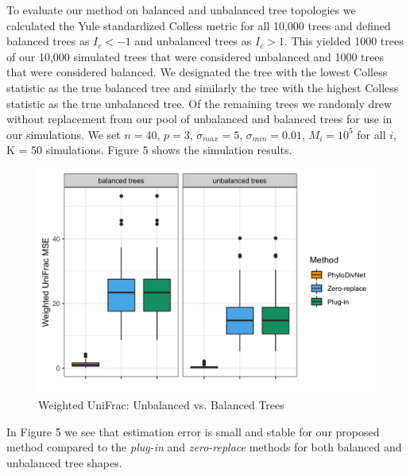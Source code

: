 \documentclass{article}
\begin{document}
To evaluate our method on balanced and unbalanced tree topologies we calculated the Yule standardized Colless metric for all 10,000 trees and defined balanced trees as $I_c < -1$ and unbalanced trees as $I_c > 1$. This yielded 1000 trees of our 10,000 simulated trees that were considered unbalanced and 1000 trees that were considered balanced. We designated the tree with the lowest Colless statistic as the true balanced tree and similarly the tree with the highest Colless statistic as the true unbalanced tree. Of the remaining trees we randomly drew without replacement from our pool of unbalanced and balanced trees for use in our simulations. We set $n = 40$, $ p = 3$, $\sigma_{max} = 5$, $\sigma_{min} = 0.01$, $M_{i} = 10^5$ for all $i$, K = 50 simulations. Figure 5 shows the simulation results.

\begin{figure}[!htb]
    \centering
    \captionsetup{singlelinecheck = false, format= hang, justification = raggedright, font = sf, labelsep = space}
    \includegraphics[width=\textwidth]{tree_vary.png}
    \caption{Weighted UniFrac: Unbalanced vs. Balanced Trees}
    \label{fig:my_label}
\end{figure}

In Figure 5 we see that estimation error is small and stable for our proposed method compared to the \textit{plug-in} and \textit{zero-replace} methods for both balanced and unbalanced tree shapes.
\end{document}
